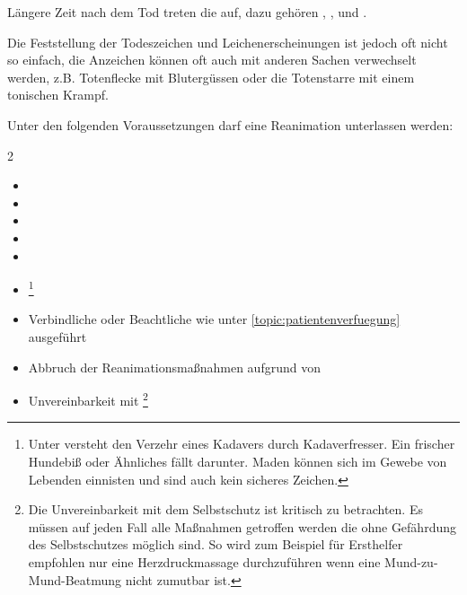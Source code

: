 Längere Zeit nach dem Tod treten die  auf, dazu gehören , ,  und
. 

Die Feststellung der Todeszeichen und Leichenerscheinungen
ist jedoch oft nicht so einfach, die Anzeichen können oft
auch mit anderen Sachen verwechselt werden, z.B.
Totenflecke mit Blutergüssen oder die Totenstarre mit einem
tonischen Krampf.



Unter den folgenden Voraussetzungen darf eine
Reanimation unterlassen
werden:

\begin{multicols}{2}

\begin{itemize}
    \item {}
    \item {}
    \item {}
    \item {}
    \item {}
    \item {}\footnote{Unter
     versteht den Verzehr eines Kadavers
    durch Kadaverfresser. Ein frischer Hundebiß oder
    Ähnliches fällt  darunter. Maden können
    sich im Gewebe von Lebenden einnisten und sind
    auch kein sicheres Zeichen.}
    \item Verbindliche oder Beachtliche
     wie unter \ref{topic:patientenverfuegung} ausgeführt
    \item Abbruch der Reanimationsmaßnahmen aufgrund
    von 
    \item Unvereinbarkeit mit
    \footnote{Die Unvereinbarkeit mit dem Selbstschutz ist kritisch zu
    betrachten. Es müssen auf jeden Fall alle Maßnahmen
    getroffen werden die ohne Gefährdung des Selbstschutzes
    möglich sind. So wird zum Beispiel für Ersthelfer
    empfohlen nur eine Herzdruckmassage durchzuführen wenn
    eine Mund-zu-Mund-Beatmung nicht zumutbar ist.}
\end{itemize}
\end{multicols}




\nocite{amls3,emergency9,phtls6,RedelsteinerHRNS1}

\gChapterBibliography





